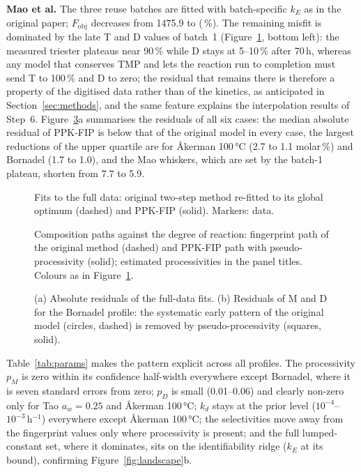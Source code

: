 \textbf{Mao et al.} The three reuse batches are fitted with batch-specific $k_E$ as in the original paper; $F_\mathrm{obj}$ decreases from 1475.9 to \InMaoFnew{} (\InMaoRed\,\%). The remaining misfit is dominated by the late T and D values of batch~1 (Figure~\ref{fig:fits}, bottom left): the measured triester plateaus near 90\,\% while D stays at 5--10\,\% after 70\,h, whereas any model that conserves TMP and lets the reaction run to completion must send T to 100\,\% and D to zero; the residual that remains there is therefore a property of the digitised data rather than of the kinetics, as anticipated in Section~\ref{sec:methods}, and the same feature explains the interpolation results of Step~6. Figure~\ref{fig:resid}a summarises the residuals of all six cases: the median absolute residual of PPK-FIP is below that of the original model in every case, the largest reductions of the upper quartile are for Åkerman 100\,°C (2.7 to 1.1 molar\,\%) and Bornadel (1.7 to 1.0), and the Mao whiskers, which are set by the batch-1 plateau, shorten from 7.7 to 5.9.
\begin{figure}[!htbp]\centering{}\caption{Fits to the full data: original two-step method re-fitted to its global optimum (dashed) and PPK-FIP (solid). Markers: data.}\label{fig:fits}\end{figure}
\begin{figure}[!htbp]\centering{}\caption{Composition paths against the degree of reaction: fingerprint path of the original method (dashed) and PPK-FIP path with pseudo-processivity (solid); estimated processivities in the panel titles. Colours as in Figure~\ref{fig:fits}.}\label{fig:paths}\end{figure}
\begin{figure}[!htbp]\centering{}\caption{(a) Absolute residuals of the full-data fits. (b) Residuals of M and D for the Bornadel profile: the systematic early pattern of the original model (circles, dashed) is removed by pseudo-processivity (squares, solid).}\label{fig:resid}\end{figure}

Table~\ref{tab:params} makes the pattern explicit across all profiles. The processivity $p_M$ is zero within its confidence half-width everywhere except Bornadel, where it is seven standard errors from zero; $p_D$ is small (0.01--0.06) and clearly non-zero only for Tao $a_w=0.25$ and Åkerman 100\,°C; $k_d$ stays at the prior level ($10^{-4}$--$10^{-3}$\,h$^{-1}$) everywhere except Åkerman 100\,°C; the selectivities move away from the fingerprint values only where processivity is present; and the full lumped-constant set, where it dominates, sits on the identifiability ridge ($k_E$ at its bound), confirming Figure~\ref{fig:landscape}b.

